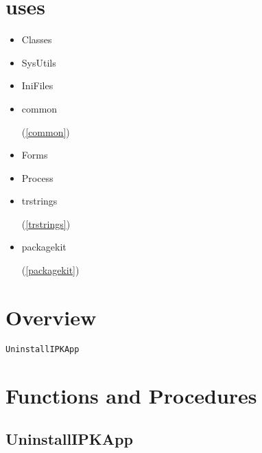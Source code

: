 \documentclass{report}
\newif\ifpdf
\begin{document}
\section{uses}
\begin{itemize}
\item \begin{ttfamily}Classes\end{ttfamily}\item \begin{ttfamily}SysUtils\end{ttfamily}\item \begin{ttfamily}IniFiles\end{ttfamily}\item \begin{ttfamily}common\end{ttfamily}(\ref{common})\item \begin{ttfamily}Forms\end{ttfamily}\item \begin{ttfamily}Process\end{ttfamily}\item \begin{ttfamily}trstrings\end{ttfamily}(\ref{trstrings})\item \begin{ttfamily}packagekit\end{ttfamily}(\ref{packagekit})\end{itemize}
\section{Overview}
\begin{description}
\item[\texttt{UninstallIPKApp}]
\end{description}
\section{Functions and Procedures}
\ifpdf
\subsection*{\large{\textbf{UninstallIPKApp}}\normalsize\hspace{1ex}\hrulefill}
\else
\end{document}
